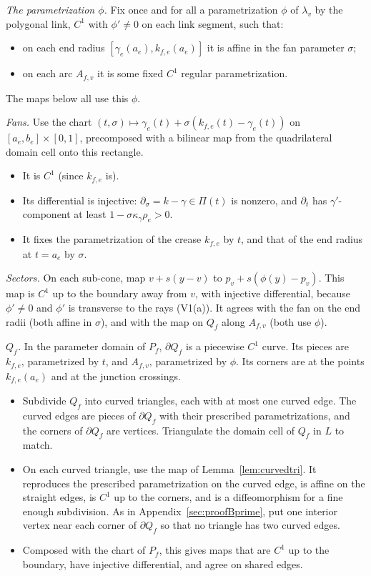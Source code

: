 \documentclass[preprint,12pt]{elsarticle}
\theoremstyle{definition}
\theoremstyle{remark}
\begin{document}
\emph{The parametrization $\phi$.} Fix once and for all a parametrization $\phi$ of $\lambda_v$ by the polygonal link,
$C^1$ with $\phi'\ne0$ on each link segment, such that:
\begin{itemize}
\item on each end radius $[\gamma_e(a_e),k_{f,e}(a_e)]$ it is affine in the fan parameter $\sigma$;
\item on each arc $A_{f,v}$ it is some fixed $C^1$ regular parametrization.
\end{itemize}
The maps below all use this $\phi$.

\emph{Fans.} Use the chart $(t,\sigma)\mapsto\gamma_e(t)+\sigma(k_{f,e}(t)-\gamma_e(t))$ on $[a_e,b_e]\times[0,1]$,
precomposed with a bilinear map from the quadrilateral domain cell onto this rectangle.
\begin{itemize}
\item It is $C^1$ (since $k_{f,e}$ is).
\item Its differential is injective: $\partial_\sigma=k-\gamma\in\Pi(t)$ is nonzero, and $\partial_t$ has
$\gamma'$-component at least $1-\sigma\kappa_\gamma\rho_e>0$.
\item It fixes the parametrization of the crease $k_{f,e}$ by $t$, and that of the end radius at $t=a_e$ by $\sigma$.
\end{itemize}

\emph{Sectors.} On each sub-cone, map $v+s(y-v)$ to $p_v+s(\phi(y)-p_v)$. This map is $C^1$ up to the boundary
away from $v$, with injective differential, because $\phi'\ne0$ and $\phi'$ is transverse to the rays (V1(a)). It agrees
with the fan on the end radii (both affine in $\sigma$), and with the map on $Q_f$ along $A_{f,v}$ (both use $\phi$).

\emph{$Q_f$.} In the parameter domain of $P_f$, $\partial Q_f$ is a piecewise $C^1$ curve. Its pieces are $k_{f,e}$,
parametrized by $t$, and $A_{f,v}$, parametrized by $\phi$. Its corners are at the points $k_{f,e}(a_e)$ and at the
junction crossings.
\begin{itemize}
\item Subdivide $Q_f$ into curved triangles, each with at most one curved edge. The curved edges are pieces of
$\partial Q_f$ with their prescribed parametrizations, and the corners of $\partial Q_f$ are vertices. Triangulate the
domain cell of $Q_f$ in $L$ to match.
\item On each curved triangle, use the map of Lemma~\ref{lem:curvedtri}. It reproduces the prescribed
parametrization on the curved edge, is affine on the straight edges, is $C^1$ up to the corners, and is a diffeomorphism
for a fine enough subdivision. As in Appendix~\ref{sec:proofBprime}, put one interior vertex near each corner of
$\partial Q_f$ so that no triangle has two curved edges.
\item Composed with the chart of $P_f$, this gives maps that are $C^1$ up to the boundary, have injective
differential, and agree on shared edges.
\end{itemize}
\end{document}

